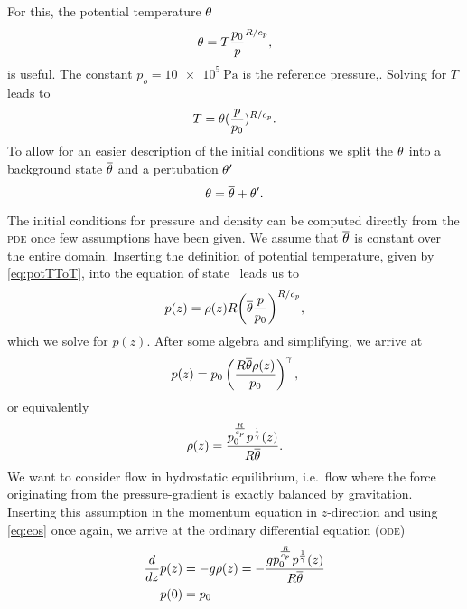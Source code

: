 For this, the potential temperature $\theta$
\begin{equation}
  \theta = T \frac{p_0}{p}^{R/c_p},
\end{equation}
is useful.
The constant $p_o = \SI{10e5}{\Pa}$ is the reference pressure,.
Solving for $T$ leads to
\begin{equation}
  \label{eq:potTToT}
  T = \theta (\frac{p}{p_0})^{R/c_p}.
\end{equation}
To allow for an easier description of the initial conditions we split the $\theta$ into a background state $\overline{\theta}$ and a pertubation $\theta'$
\begin{equation}
  \label{eq:potT-split}
  \theta = \overline{\theta} + \theta'.
\end{equation}

The initial conditions for pressure and density can be computed directly from the \textsc{pde} once few assumptions have been given.
We assume that $\overline{\theta}$ is constant over the entire domain.
Inserting the definition of potential temperature, given by \cref{eq:potTToT}, into the equation of state~ leads us to
\begin{equation}
  p(z) = \rho(z) R {\left( \overline{\theta} \frac{p}{p_0}\right)}^{R/c_p},
\end{equation}
which we solve for $p(z)$.
After some algebra and simplifying, we arrive at
\begin{equation}
 p(z) = p_0 \left( \frac{R \overline{\theta} \rho(z)}{p_0} \right)^{\gamma},
\end{equation}
or equivalently
\begin{equation}
  \label{eq:eos-potT}
\rho(z) = \frac{p_{0}^{\frac{R}{c_{p}}} p^{\frac{1}{\gamma}}{\left (z \right )}}{R \overline{\theta}}.
\end{equation}
We want to consider flow in hydrostatic equilibrium, i.e.\ flow where the force originating from the pressure-gradient is exactly balanced by gravitation.
Inserting this assumption in the momentum equation in $z$-direction and using \cref{eq:eos} once again, we arrive at the ordinary differential equation (\textsc{ode})
\begin{align}
  \label{eq:hydrostatic-balance-potT}
  \begin{split}
  \frac{d}{d z} p{\left (z \right )} &= -g \rho(z)
                                     = 
        - \frac{g p_{0}^{\frac{R}{c_{p}}} p^{\frac{1}{\gamma}}{\left (z \right )}}{R \overline{\theta}}\\
  p{\left (0 \right )} &= p_0
  \end{split}
\end{align}
